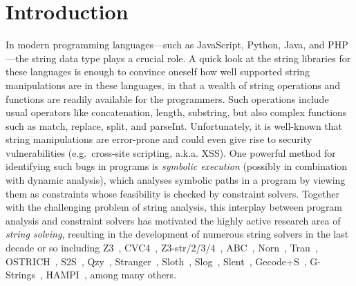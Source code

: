 
\section{Introduction}\label{sec-intro}



%
In modern programming languages---such as JavaScript, Python, Java, and PHP---the string data type plays a crucial role.
A quick look at the string libraries for these languages is enough to convince
oneself how well supported string manipulations are in these languages, in that
a wealth of string operations and functions are readily available for the
programmers.
Such operations include usual operators like concatenation, length, substring,
but also complex functions such as
match, replace, split, and parseInt.
Unfortunately, it is well-known that string manipulations are error-prone and
could even give rise to
security vulnerabilities (e.g.\ cross-site scripting, a.k.a. XSS).
One powerful method for identifying such bugs in programs is \emph{symbolic
execution} (possibly in combination with dynamic analysis), which
analyses symbolic paths in a program by viewing them as constraints %
whose feasibility is checked by constraint solvers.
Together with the challenging problem of string analysis,
this interplay between program analysis and constraint solvers has motivated
the highly active research area of \emph{string solving}, resulting in the
development of numerous string solvers in the last decade or so including
Z3~\cite{Z3}, CVC4~\cite{cvc4}, Z3-str/2/3/4~\cite{Z3-str,Z3-str2,Z3-str3,BerzishMurphy2021},
 ABC~\cite{ABC}, Norn~\cite{Abdulla14},
Trau~\cite{Z3-trau,AbdullaACDHRR18-trau,Abdulla17}, OSTRICH~\cite{CHL+19}, S2S~\cite{DBLP:conf/aplas/LeH18}, Qzy~\cite{cox2017model}, Stranger~\cite{Stranger}, Sloth~\cite{HJLRV18,AbdullaA+19},
Slog~\cite{fang-yu-circuits}, Slent~\cite{WC+18}, Gecode+S~\cite{DBLP:conf/cpaior/ScottFPS17}, G-Strings~\cite{DBLP:conf/cp/AmadiniGST17}, HAMPI~\cite{HAMPI}, among many others. %

